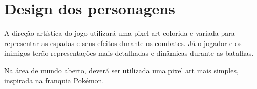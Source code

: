 \section{Design dos personagens}

A direção artística do jogo utilizará uma pixel art colorida 
e variada para representar as espadas e seus efeitos durante 
os combates. Já o jogador e os inimigos terão representações 
mais detalhadas e dinâmicas durante as batalhas.

Na área de mundo aberto, deverá ser utilizada uma 
pixel art mais simples, inspirada na franquia Pokémon.